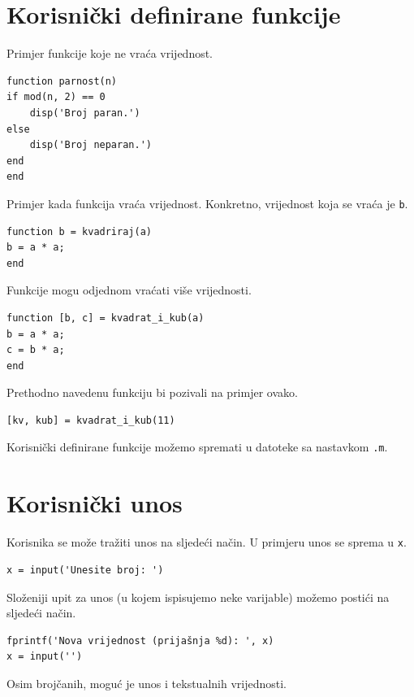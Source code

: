 \documentclass[a4paper, 10pt]{article}
\begin{document}
\section{Korisnički definirane funkcije}

Primjer funkcije koje ne vraća vrijednost.

\begin{lstlisting}
function parnost(n)
if mod(n, 2) == 0
    disp('Broj paran.')
else
    disp('Broj neparan.')
end
end
\end{lstlisting}

Primjer kada funkcija vraća vrijednost. Konkretno, vrijednost koja se vraća je \texttt{b}.

\begin{lstlisting}
function b = kvadriraj(a)
b = a * a;
end
\end{lstlisting}

Funkcije mogu odjednom vraćati više vrijednosti.

\begin{lstlisting}
function [b, c] = kvadrat_i_kub(a)
b = a * a;
c = b * a;
end
\end{lstlisting}

Prethodno navedenu funkciju bi pozivali na primjer ovako.

\begin{lstlisting}
[kv, kub] = kvadrat_i_kub(11)
\end{lstlisting}

Korisnički definirane funkcije možemo spremati u datoteke sa nastavkom \texttt{.m}.

\section{Korisnički unos}

Korisnika se može tražiti unos na sljedeći način. U primjeru unos se sprema u \texttt{x}.

\begin{lstlisting}
x = input('Unesite broj: ')
\end{lstlisting}

Složeniji upit za unos (u kojem ispisujemo neke varijable) možemo postići na sljedeći način.

\begin{lstlisting}
fprintf('Nova vrijednost (prijašnja %d): ', x)
x = input('')
\end{lstlisting}

Osim brojčanih, moguć je unos i tekstualnih vrijednosti.
\end{document}
